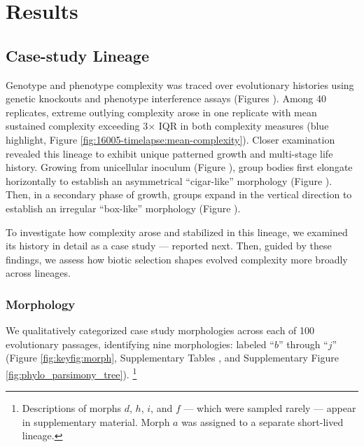 





\section{Results}

\subsection{Case-study Lineage}

Genotype and phenotype complexity was traced over evolutionary histories using genetic knockouts and phenotype interference assays (Figures ).
Among 40 replicates, extreme outlying complexity arose in one replicate with mean sustained complexity exceeding 3$\times$ IQR in both complexity measures (blue highlight, Figure \ref{fig:16005-timelapse:mean-complexity}).
Closer examination revealed this lineage to exhibit unique patterned growth and multi-stage life history.
Growing from unicellular inoculum (Figure ), group bodies first elongate horizontally to establish an asymmetrical ``cigar-like'' morphology (Figure ).
Then, in a secondary phase of growth, groups expand in the vertical direction to establish an irregular ``box-like'' morphology (Figure ).

To investigate how complexity arose and stabilized in this lineage, we examined its history in detail as a case study --- reported next.
Then, guided by these findings, we assess how biotic selection shapes evolved complexity more broadly across lineages.



\subsubsection{Morphology}

We qualitatively categorized case study morphologies across each of 100 evolutionary passages,
identifying nine morphologies: labeled ``$b$'' through ``$j$'' (Figure \ref{fig:keyfig:morph}, Supplementary Tables , and Supplementary Figure \ref{fig:phylo_parsimony_tree}).
\unskip\footnote{%
Descriptions of morphs $d$, $h$, $i$, and $f$ --- which were sampled rarely --- appear in supplementary material.
Morph $a$ was assigned to a separate short-lived lineage.
}

